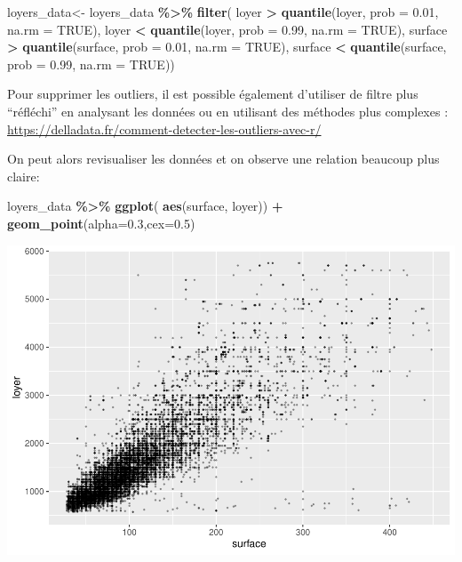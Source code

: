 \documentclass[
]{book}
\newenvironment{Shaded}{\begin{snugshade}}{\end{snugshade}}
\newcommand{\AttributeTok}[1]{\textcolor[rgb]{0.13,0.29,0.53}{#1}}
\newcommand{\ConstantTok}[1]{\textcolor[rgb]{0.56,0.35,0.01}{#1}}
\newcommand{\FloatTok}[1]{\textcolor[rgb]{0.00,0.00,0.81}{#1}}
\newcommand{\FunctionTok}[1]{\textcolor[rgb]{0.13,0.29,0.53}{\textbf{#1}}}
\newcommand{\NormalTok}[1]{#1}
\newcommand{\OtherTok}[1]{\textcolor[rgb]{0.56,0.35,0.01}{#1}}
\newcommand{\SpecialCharTok}[1]{\textcolor[rgb]{0.81,0.36,0.00}{\textbf{#1}}}
\begin{document}
\begin{Shaded}
\begin{Highlighting}[]
\NormalTok{loyers\_data}\OtherTok{\textless{}{-}}\NormalTok{ loyers\_data }\SpecialCharTok{\%\textgreater{}\%}
  \FunctionTok{filter}\NormalTok{(}
\NormalTok{    loyer }\SpecialCharTok{\textgreater{}} \FunctionTok{quantile}\NormalTok{(loyer, }\AttributeTok{prob =} \FloatTok{0.01}\NormalTok{, }\AttributeTok{na.rm =} \ConstantTok{TRUE}\NormalTok{),}
\NormalTok{    loyer }\SpecialCharTok{\textless{}} \FunctionTok{quantile}\NormalTok{(loyer, }\AttributeTok{prob =} \FloatTok{0.99}\NormalTok{, }\AttributeTok{na.rm =} \ConstantTok{TRUE}\NormalTok{),}
\NormalTok{    surface }\SpecialCharTok{\textgreater{}} \FunctionTok{quantile}\NormalTok{(surface, }\AttributeTok{prob =} \FloatTok{0.01}\NormalTok{, }\AttributeTok{na.rm =} \ConstantTok{TRUE}\NormalTok{),}
\NormalTok{    surface }\SpecialCharTok{\textless{}} \FunctionTok{quantile}\NormalTok{(surface, }\AttributeTok{prob =} \FloatTok{0.99}\NormalTok{, }\AttributeTok{na.rm =} \ConstantTok{TRUE}\NormalTok{))}
\end{Highlighting}
\end{Shaded}

Pour supprimer les outliers, il est possible également d'utiliser de
filtre plus ``réfléchi'' en analysant les données ou en utilisant des
méthodes plus complexes :
\url{https://delladata.fr/comment-detecter-les-outliers-avec-r/}

On peut alors revisualiser les données et on observe une relation
beaucoup plus claire:

\begin{Shaded}
\begin{Highlighting}[]
\NormalTok{loyers\_data }\SpecialCharTok{\%\textgreater{}\%}
    \FunctionTok{ggplot}\NormalTok{( }\FunctionTok{aes}\NormalTok{(surface, loyer)) }\SpecialCharTok{+}
    \FunctionTok{geom\_point}\NormalTok{(}\AttributeTok{alpha=}\FloatTok{0.3}\NormalTok{,}\AttributeTok{cex=}\FloatTok{0.5}\NormalTok{)}
\end{Highlighting}
\end{Shaded}

\includegraphics{manuel_geo_quanti_files/figure-latex/unnamed-chunk-6-1.pdf}
\end{document}
